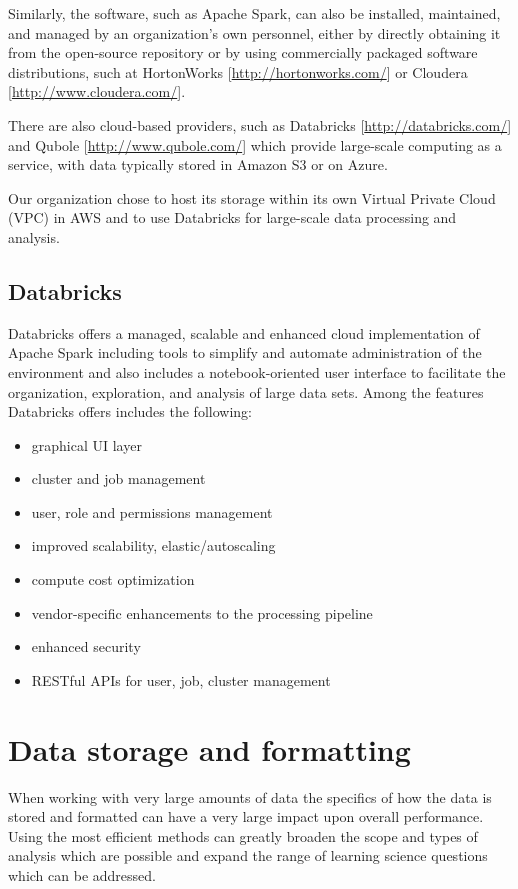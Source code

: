 \documentclass[runningheads,a4paper]{llncs}
\begin{document}
Similarly, the software, such as Apache Spark, can also be installed, maintained, and managed by an organization's own personnel, either by directly obtaining it from the open-source repository or by using  commercially packaged software distributions, such at HortonWorks [\url{http://hortonworks.com/}] or Cloudera [\url{http://www.cloudera.com/}].

There are also cloud-based providers, such as Databricks [\url{http://databricks.com/}] and Qubole [\url{http://www.qubole.com/}] which provide large-scale computing as a service, with data typically stored in Amazon S3 or on Azure.

Our organization chose to host its storage within its own Virtual Private Cloud (VPC) in AWS and to use Databricks for large-scale data processing and analysis.

\subsection{Databricks}

Databricks offers a managed, scalable and enhanced cloud implementation of Apache Spark including tools to simplify and automate administration of the environment and also includes a notebook-oriented user interface to facilitate the organization, exploration, and analysis of large data sets.  Among the features Databricks offers includes the following:

\begin{itemize}
\item graphical UI layer
\item cluster and job management
\item  user, role and permissions management
\item  improved scalability, elastic/autoscaling
\item  compute cost optimization
\item  vendor-specific enhancements to the processing pipeline
\item  enhanced security
\item  RESTful APIs for user, job, cluster management
\end{itemize}

\section{Data storage and formatting}

When working with very large amounts of data the specifics of how the data is stored and formatted can have a very large impact upon overall performance.  Using the most efficient methods can greatly broaden the scope and types of analysis which are possible and expand the range of learning science questions which can be addressed.
\end{document}
